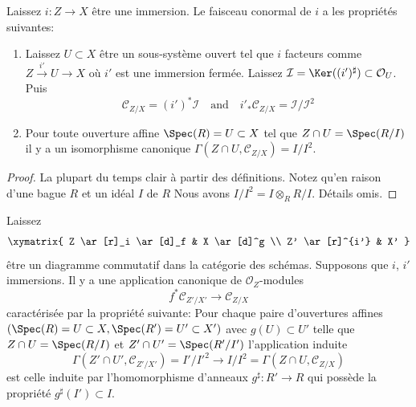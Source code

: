 \begin{lemma}

\label{lemma-affine-conormal}
Laissez $i : Z \to X$ être une immersion. Le faisceau conormal de $i$ a les propriétés suivantes:
\begin{enumerate}
\item Laissez $U \subset X$ être un sous-système ouvert tel que $i$ facteurs comme $Z \xrightarrow{i'} U \to X$ où $i'$ est une immersion fermée. Laissez $\mathcal{I} = \Ker((i')^\sharp) \subset \mathcal{O}_U$. Puis $$
\mathcal{C}_{Z/X} = (i')^*\mathcal{I}\quad\text{and}\quad
i'_*\mathcal{C}_{Z/X} = \mathcal{I}/\mathcal{I}^2
$$
\item Pour toute ouverture affine $\Spec(R) = U \subset X$ tel que $Z \cap U = \Spec(R/I)$ il y a un isomorphisme canonique $\Gamma(Z \cap U, \mathcal{C}_{Z/X}) = I/I^2$.
\end{enumerate}

\end{lemma}

\begin{proof}

La plupart du temps clair à partir des définitions. Notez qu'en raison d'une bague $R$ et un idéal $I$ de $R$ Nous avons $I/I^2 = I \otimes_R R/I$. Détails omis.

\end{proof}

\begin{lemma}

\label{lemma-conormal-functorial}
Laissez $$
\xymatrix{
Z \ar[r]_i \ar[d]_f & X \ar[d]^g \\
Z' \ar[r]^{i'} & X'
}
$$ être un diagramme commutatif dans la catégorie des schémas. Supposons que $i$, $i'$ immersions. Il y a une application canonique de $\mathcal{O}_Z$-modules $$
f^*\mathcal{C}_{Z'/X'}
\longrightarrow
\mathcal{C}_{Z/X}
$$ caractérisée par la propriété suivante: Pour chaque paire d'ouvertures affines $(\Spec(R) = U \subset X, \Spec(R') = U' \subset X')$ avec $g(U) \subset U'$ telle que $Z \cap U = \Spec(R/I)$ et $Z' \cap U' = \Spec(R'/I')$ l'application induite $$
\Gamma(Z' \cap U', \mathcal{C}_{Z'/X'}) = I'/I'^2
\longrightarrow
I/I^2 = \Gamma(Z \cap U, \mathcal{C}_{Z/X})
$$ est celle induite par l'homomorphisme d'anneaux $g^\sharp : R' \to R$ qui possède la propriété $g^\sharp(I') \subset I$.
\end{lemma}

